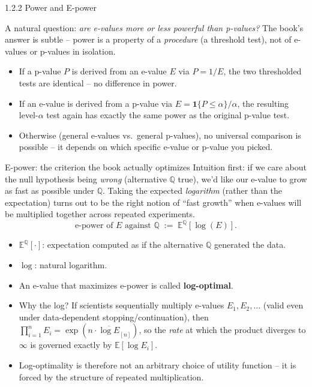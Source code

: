 \documentclass[aspectratio=169,10pt]{beamer}
\begin{document}
\begin{frame}[allowframebreaks]{1.2.2 Power and E-power}

A natural question: \emph{are e-values more or less powerful than
p-values?} The book's answer is subtle -- power is a property of a
\emph{procedure} (a threshold test), not of e-values or p-values in
isolation.

\begin{itemize}
  \item If a p-value $P$ is derived from an e-value $E$ via $P=1/E$, the
    two thresholded tests are identical -- no difference in power.
  \item If an e-value is derived from a p-value via
    $E=\mathbf{1}\{P\le\alpha\}/\alpha$, the resulting level-$\alpha$ test
    again has exactly the same power as the original p-value test.
  \item Otherwise (general e-values vs.\ general p-values), no universal
    comparison is possible -- it depends on which specific e-value or
    p-value you picked.
\end{itemize}

\framebreak

\begin{block}{E-power: the criterion the book actually optimizes}
Intuition first: if we care about the null hypothesis being \emph{wrong}
(alternative $\mathbb{Q}$ true), we'd like our e-value to grow as fast as
possible under $\mathbb{Q}$. Taking the expected \emph{logarithm} (rather
than the expectation) turns out to be the right notion of ``fast growth''
when e-values will be multiplied together across repeated experiments.
\[
  \text{e-power of } E \text{ against } \mathbb{Q} \;:=\; \mathbb{E}^{\mathbb{Q}}[\log(E)].
\]
\begin{itemize}
  \item $\mathbb{E}^{\mathbb{Q}}[\cdot]$: expectation computed as if the
    alternative $\mathbb{Q}$ generated the data.
  \item $\log$: natural logarithm.
  \item An e-value that maximizes e-power is called \textbf{log-optimal}.
\end{itemize}
\end{block}

\framebreak

\begin{itemize}
  \item Why the log? If scientists sequentially multiply e-values
    $E_1, E_2,\dots$ (valid even under data-dependent stopping/continuation),
    then $\prod_{i=1}^n E_i = \exp(n\cdot\overline{\log E}_{[n]})$, so the
    \emph{rate} at which the product diverges to $\infty$ is governed
    exactly by $\mathbb{E}[\log E_i]$.
  \item Log-optimality is therefore not an arbitrary choice of utility
    function -- it is forced by the structure of repeated multiplication.
\end{itemize}


\end{frame}
\end{document}

